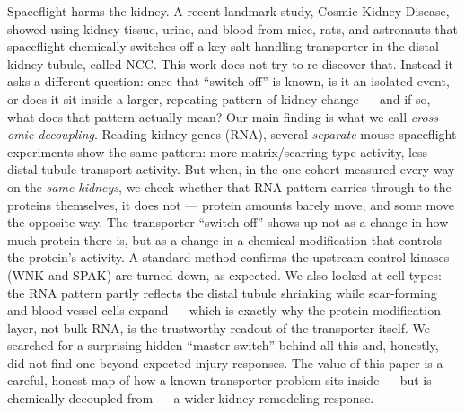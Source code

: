 \documentclass[11pt]{article}
\begin{document}
\noindent
Spaceflight harms the kidney. A recent landmark study, Cosmic Kidney Disease, showed using kidney tissue, urine, and blood from mice, rats, and astronauts that spaceflight chemically switches off a key salt-handling transporter in the distal kidney tubule, called NCC. This work does not try to re-discover that. Instead it asks a different question: once that ``switch-off'' is known, is it an isolated event, or does it sit inside a larger, repeating pattern of kidney change --- and if so, what does that pattern actually mean? Our main finding is what we call \emph{cross-omic decoupling}. Reading kidney genes (RNA), several \emph{separate} mouse spaceflight experiments show the same pattern: more matrix/scarring-type activity, less distal-tubule transport activity. But when, in the one cohort measured every way on the \emph{same kidneys}, we check whether that RNA pattern carries through to the proteins themselves, it does not --- protein amounts barely move, and some move the opposite way. The transporter ``switch-off'' shows up not as a change in how much protein there is, but as a change in a chemical modification that controls the protein's activity. A standard method confirms the upstream control kinases (WNK and SPAK) are turned down, as expected. We also looked at cell types: the RNA pattern partly reflects the distal tubule shrinking while scar-forming and blood-vessel cells expand --- which is exactly why the protein-modification layer, not bulk RNA, is the trustworthy readout of the transporter itself. We searched for a surprising hidden ``master switch'' behind all this and, honestly, did not find one beyond expected injury responses. The value of this paper is a careful, honest map of how a known transporter problem sits inside --- but is chemically decoupled from --- a wider kidney remodeling response.

\vspace{0.8em}
\end{document}
